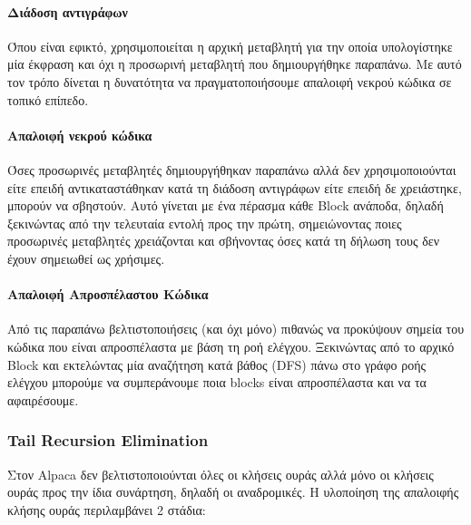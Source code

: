 \documentclass[12pt]{article}
\begin{document}
\paragraph{Διάδοση αντιγράφων}
Όπου είναι εφικτό, χρησιμοποιείται η αρχική μεταβλητή για την οποία υπολογίστηκε μία έκφραση και όχι η προσωρινή μεταβλητή που δημιουργήθηκε παραπάνω. Με αυτό τον τρόπο δίνεται η δυνατότητα να πραγματοποιήσουμε απαλοιφή νεκρού κώδικα σε τοπικό επίπεδο.
\paragraph{Απαλοιφή νεκρού κώδικα}
Όσες προσωρινές μεταβλητές δημιουργήθηκαν παραπάνω αλλά δεν χρησιμοποιούνται είτε επειδή αντικαταστάθηκαν κατά τη διάδοση αντιγράφων είτε επειδή δε χρειάστηκε, μπορούν να σβηστούν. Αυτό γίνεται με ένα πέρασμα κάθε Block ανάποδα, δηλαδή ξεκινώντας από την τελευταία εντολή προς την πρώτη, σημειώνοντας ποιες προσωρινές μεταβλητές χρειάζονται και σβήνοντας όσες κατά τη δήλωση τους δεν έχουν σημειωθεί ως χρήσιμες.
\paragraph{Απαλοιφή Απροσπέλαστου Κώδικα}
Από τις παραπάνω βελτιστοποιήσεις (και όχι μόνο) πιθανώς να προκύψουν σημεία του κώδικα που είναι απροσπέλαστα με βάση τη ροή ελέγχου. Ξεκινώντας από το αρχικό Block και εκτελώντας μία αναζήτηση κατά βάθος (DFS) πάνω στο γράφο ροής ελέγχου μπορούμε να συμπεράνουμε ποια blocks είναι απροσπέλαστα και να τα αφαιρέσουμε.
\subsubsection{Tail Recursion Elimination}
Στον Alpaca δεν βελτιστοποιούνται όλες οι κλήσεις ουράς αλλά μόνο οι κλήσεις ουράς προς την ίδια συνάρτηση, δηλαδή οι αναδρομικές. Η υλοποίηση της απαλοιφής κλήσης ουράς περιλαμβάνει 2 στάδια:
\end{document}
